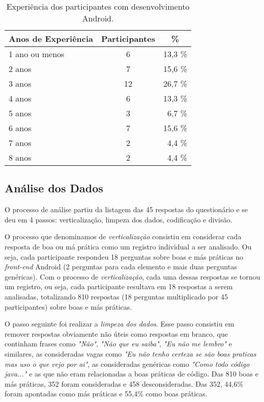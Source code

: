 \begin{table}[h]
\centering
\small
\begin{tabular}{@{}l|c|r@{}}
\toprule
\textbf{Anos de Experi\^encia} & \textbf{Participantes} & \multicolumn{1}{c}{\textbf{\%}}  \\
\hline
1 ano ou menos 	&	 6 		& 	13,3 \%	 \\
2 anos 			& 	 7 		& 	15,6 \%	 \\
3 anos 			& 	 12		& 	26,7 \%	 \\
4 anos 			& 	 6 		& 	13,3 \%	 \\
5 anos 			& 	 3 		& 	 6,7 \%	 \\
6 anos 			& 	 7 		& 	15,6 \%	 \\
7 anos 			& 	 2 		& 	 4,4 \%	 \\
8 anos 			& 	 2 		& 	 4,4 \%	 \\
\toprule
\end{tabular}
\caption{Experi\^encia dos participantes com desenvolvimento Android.}
\label{tab:DadosDemograficos}
\end{table}

\subsection{An\'alise dos Dados}
\label{sub:smells-definition}

O processo de an\'alise partiu da listagem das 45 respostas do question\'ario e se deu em 4 passos: verticaliza\c{c}\~ao, limpeza dos dados, codifica\c{c}\~ao e divis\~ao. 

O processo que denominamos de \textit{verticaliza\c{c}\~ao} consistiu em considerar cada resposta de boa ou m\'a pr\'atica como um registro individual a ser analisado. Ou seja, cada participante respondeu 18 perguntas sobre boas e m\'as pr\'aticas no \textit{front-end} Android (2 perguntas para cada elemento e mais duas perguntas gen\'ericas). Com o processo de \textit{verticaliza\c{c}\~ao}, cada uma dessas respostas se tornou um registro, ou seja, cada participante resultava em 18 respostas a serem analisadas, totalizando 810 respostas (18 perguntas multiplicado por 45 participantes) sobre boas e m\'as pr\'aticas.

O passo seguinte foi realizar a \textit{limpeza dos dados}. Esse passo consistiu em remover respostas obviamente n\~ao \'uteis como respostas em branco, que continham frases como \textit{"N\~ao"}, \textit{"N\~ao que eu saiba"}, \textit{"Eu n\~ao me lembro"} e similares, as consideradas vagas como \textit{"Eu n\~ao tenho certeza se s\~ao boas praticas mas uso o que vejo por ai"}, as consideradas gen\'ericas como \textit{"Como todo c\'odigo java..."} e as que n\~ao eram relacionadas a boas pr\'aticas de c\'odigo. Das 810 boas e m\'as pr\'aticas, 352 foram consideradas e 458 desconsideradas. Das 352, 44,6\% foram apontadas como m\'as pr\'aticas e 55,4\% como boas pr\'aticas. 

